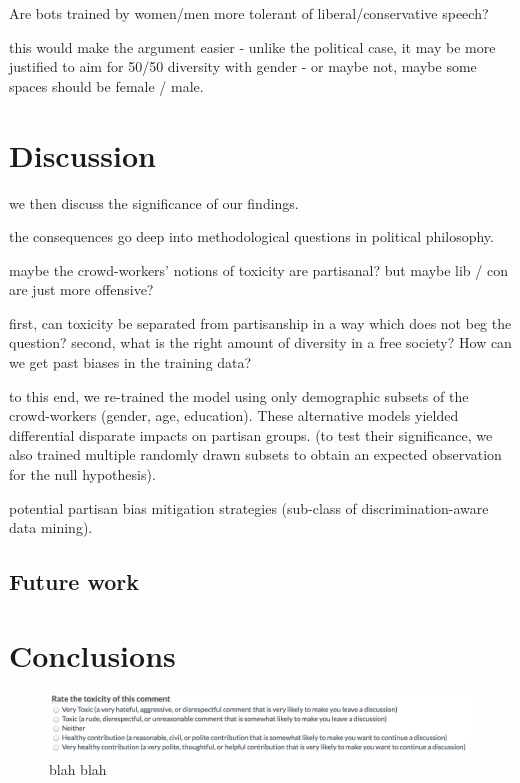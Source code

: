 \documentclass[sigconf]{acmart}
\begin{document}
Are bots trained by women/men more tolerant of liberal/conservative speech? 

this would make the argument easier - unlike the political case, it may be more justified to aim for 50/50 diversity with gender - or maybe not, maybe some spaces should be female / male.

\section{Discussion}

we then discuss the significance of our findings.

the consequences go deep into methodological questions in political philosophy.

maybe the crowd-workers’ notions of toxicity are partisanal?
but maybe lib / con are just more offensive?

first, can toxicity be separated from partisanship in a way which does not beg the question?
second, what is the right amount of diversity in a free society?
How can we get past biases in the training data?

to this end, we re-trained the model using only demographic subsets of the crowd-workers (gender, age, education). These alternative models yielded differential disparate impacts on partisan groups. (to test their significance, we also trained multiple randomly drawn subsets to obtain an expected observation for the null hypothesis).

potential partisan bias mitigation strategies (sub-class of discrimination-aware data mining).

\subsection{Future work}

\section{Conclusions}

\begin{figure}[h!]
\begin{center}
\includegraphics[width=\columnwidth]{figures/toxicity_question.png}
\caption{blah blah}\label{fig:method}
\end{center}
\end{figure}





\medskip
\end{document}
